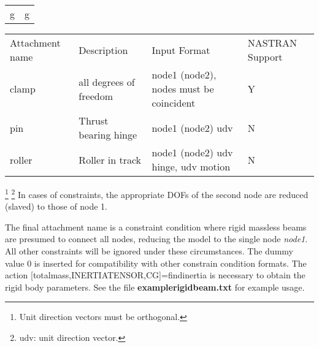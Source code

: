 \documentclass[12pt]{article}
\newcommand*{\command}[1]{\textsf{#1}}
\newcommand*{\variable}[1]{\textit{#1}}
\newcommand*{\filename}[1]{\textsf{\textbf{#1}}}
\begin{document}
\begin{tabular}{|p{}|p{1.5in}}
g&g
\end{tabular}
\begin{center}
{\small \begin{tabular}{|p{}|p{1.5in}|p{1.5in}|p{.75in}|}
  \hline
  Attachment name&Description &Input Format&NASTRAN Support\\
  \hhline{|====|} clamp & all degrees of freedom & node1 (node2), nodes must be coincident&Y\\ 
  \hline pin & Thrust bearing hinge & node1 (node2) udv &N\\ 
  \hline roller & Roller in track & node1 (node2) udv hinge, udv motion&N\\ 
\hline
\end{tabular}
}%

\end{center}
\footnote{Unit direction vectors must be orthogonal.} \footnote{udv:
    unit direction vector.}
In cases of constraints, the appropriate DOFs of the second node are reduced (slaved) to those of node 1. 

The final attachment name is a constraint condition where rigid massless beams are presumed to connect all nodes, reducing the model to the single node \variable{node1}. All other constraints will be ignored under these circumstances. The dummy value $0$ is inserted for compatibility with other constrain condition formats. The action \command{[totalmass,INERTIATENSOR,CG]=findinertia} is necessary to obtain the rigid body parameters. See the file \filename{examplerigidbeam.txt} for example usage. 
\end{document}
